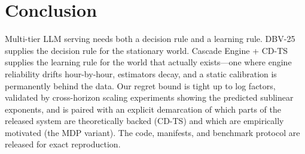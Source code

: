 \documentclass[11pt]{article}
\theoremstyle{definition}
\begin{document}
\section{Conclusion}

Multi-tier LLM serving needs both a decision rule and a learning rule.
DBV-25 supplies the decision rule for the stationary world.
Cascade Engine + CD-TS supplies the learning rule for the world that
actually exists---one where engine reliability drifts hour-by-hour,
estimators decay, and a static calibration is permanently behind the
data. Our regret bound is tight up to log factors, validated by
cross-horizon scaling experiments showing the predicted sublinear
exponents, and is paired with an explicit demarcation of which parts of
the released system are theoretically backed (CD-TS) and which are
empirically motivated (the MDP variant). The code, manifests, and
benchmark protocol are released for exact reproduction.



\end{document}
